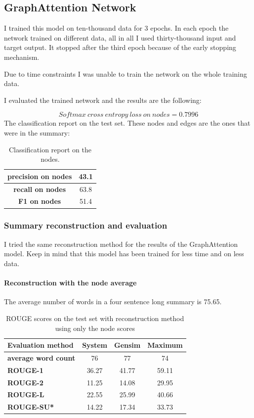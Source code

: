 \subsection{GraphAttention Network}

I trained this model on ten-thousand data for 3 epochs. In each epoch the network trained on different data, all in all I used thirty-thousand input and target output. It stopped after the third epoch because of the early stopping mechanism.

Due to time constraints I was unable to train the network on the whole training data.

I evaluated the trained network and the results are the following:

\[Softmax\ cross\ entropy\ loss\ on\ nodes = 0.7996\]
The classification report on the test set. These nodes and edges are the ones that were in the summary:

\begin{table}[!ht]
	\centering
	\begin{tabular}{| c | c |}
		\hline
		\textbf{precision on nodes}&43.1 \\ \hline
		\textbf{recall on nodes}&63.8 \\ \hline
		\textbf{F1 on nodes}&51.4 \\ \hline
	\end{tabular}
	\caption{Classification report on the nodes.}
\end{table}

\subsubsection{Summary reconstruction and evaluation}
I tried the same reconstruction method for the results of the GraphAttention model. Keep in mind that this model has been trained for less time and on less data.

\paragraph{Reconstruction with the node average}

The average number of words in a four sentence long summary is 75.65.

\begin{table}[!ht]
	\centering
	\begin{tabular}{| l | c | c | c |}
	\hline
	\textbf{Evaluation method}&\textbf{System}&\textbf{Gensim}&\textbf{Maximum}\\ \hline \hline
	\textbf{average word count}&76&77&74 \\ \hline
	\textbf{ROUGE-1}&36.27&41.77&59.11 \\ \hline
	\textbf{ROUGE-2}&11.25&14.08&29.95 \\ \hline
	\textbf{ROUGE-L}&22.55&25.99&40.66 \\ \hline
	\textbf{ROUGE-SU*}&14.22&17.34&33.73 \\ \hline
	\end{tabular}
	\caption{ROUGE scores on the test set with reconstruction method using only the node scores}
	\label{tab:attended_node}
\end{table}

